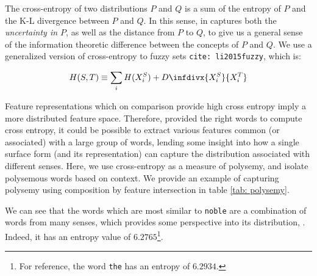 \documentclass[11pt]{book}
\newcommand{\infdiv}{D\infdivx}
\newcommand{\citep}[1]{\texttt{cite: #1}}
\begin{document}
The cross-entropy of two distributions $P$ and $Q$ is a sum of the entropy of
$P$ and the K-L divergence between $P$ and $Q$. In this sense, in captures both
the \emph{uncertainty in $P$}, as well as the distance from $P$ to $Q$, to give
us a general sense of the information theoretic difference between the concepts
of $P$ and $Q$. We use a generalized version of cross-entropy to fuzzy sets
\citep{li2015fuzzy}, which is:

{\footnotesize
\begin{equation*}
   H(S, T) \equiv \sum_i H(X^S_i) + \infdiv{X^S_i}{X^T_i}
\end{equation*}
}

Feature representations which on comparison provide high cross entropy imply a
more distributed feature space. Therefore, provided the right words to compute
cross entropy, it could be possible to extract various features common (or
associated) with a large group of words, lending some insight into how a single
surface form (and its representation) can capture the distribution associated
with different senses. Here, we use cross-entropy as a measure of polysemy, and
isolate polysemous words based on context. We provide an example of capturing
polysemy using composition by feature intersection in table \ref{tab:
polysemy}. 

We can see that the words which are most similar to \texttt{noble} are a
combination of words from many senses, which provides some perspective into its
distribution, . Indeed, it has an entropy value of $6.2765$\footnote{For
reference, the word \texttt{the} has an entropy of $6.2934$.}.
\end{document}
